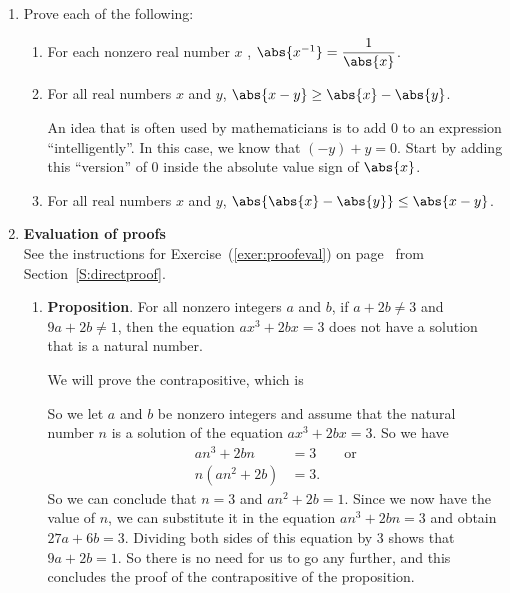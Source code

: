 \begin{enumerate}
\item Prove each of the following:
\label{exer:moreabsvalue}%
\begin{enumerate}
\item For each nonzero real number $x$ , $\abs{x^{-1}} = \dfrac{1}{\abs{x}}$.

\item For all real numbers $x$ and $y$, $\abs{x - y} \geq \abs{x} - \abs{y}$.

\hint  An idea that is often used by mathematicians is to  add 0 to an expression ``intelligently''.  In this case, we know that $\left(-y \right) + y = 0$.  Start by adding this ``version'' of 0 inside the absolute value sign of $\abs{x}$.

\item For all real numbers $x$ and $y$, $\abs{\abs{x} - \abs{y}} \leq \abs{x - y}$.
\end{enumerate}

\item \textbf{Evaluation of proofs}  \hfill \\
See the instructions for Exercise~(\ref{exer:proofeval}) on 
page~\pageref{exer:proofeval} from Section~\ref{S:directproof}.

\begin{enumerate}
\item \textbf{Proposition}. For all nonzero integers $a$ and $b$, if $a + 2b \ne 3$ and 
$9a + 2b \ne 1$, then the equation $ax^3 + 2bx = 3$ does not have a solution that is a natural number.

\begin{myproof}
We will prove the contrapositive, which is
So we let $a$ and $b$ be nonzero integers and assume that the natural number $n$ is a solution of the equation $ax^3 + 2bx = 3$.  So we have
\begin{align*}
an^3 + 2bn &= 3 \qquad \text{or}\\
n \left( an^2 + 2b \right) &= 3.
\end{align*}
So we can conclude that $n = 3$ and $an^2 + 2b = 1$.  Since we now have the value of $n$, we can substitute it in the equation $an^3 + 2bn = 3$ and obtain $27a + 6b = 3$.  Dividing both sides of this equation by 3 shows that $9a + 2b = 1$.  So there is no need for us to go any further, and  this concludes the proof of the contrapositive of the proposition.  
\end{myproof}


\end{enumerate}
\end{enumerate}
